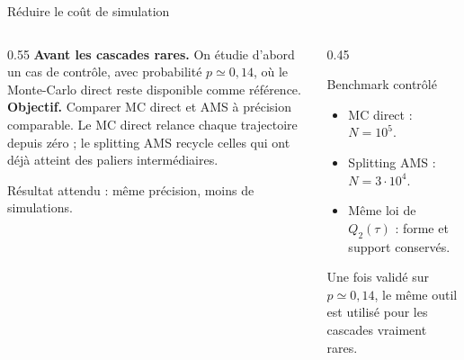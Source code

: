 \documentclass[10pt,aspectratio=169]{beamer}
\begin{document}
\begin{frame}{Réduire le coût de simulation}
\begin{columns}[T]
\begin{column}{0.55\textwidth}
\textbf{Avant les cascades rares.} On étudie d'abord un cas de contrôle, avec probabilité \alert{$p\simeq0{,}14$}, où le Monte-Carlo direct reste disponible comme référence.\\[1ex]

\textbf{Objectif.} Comparer MC direct et AMS à précision comparable. Le MC direct relance chaque trajectoire depuis zéro ; le splitting AMS \alert{recycle} celles qui ont déjà atteint des paliers intermédiaires.

\vspace{1ex}
Résultat attendu : \alert{même précision, moins de simulations}.
\end{column}
\begin{column}{0.45\textwidth}
\begin{block}{Benchmark contrôlé}
\begin{itemize}
\item MC direct : $N=10^5$.
\item Splitting AMS : $N=3\cdot10^4$.
\item Même loi de $Q_2(\tau)$ : forme et support conservés.
\end{itemize}
\end{block}
\vspace{1ex}
\centering\footnotesize
Une fois validé sur $p\simeq0{,}14$, le même outil est utilisé pour les cascades vraiment rares.
\end{column}
\end{columns}
\end{frame}
\end{document}
